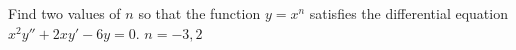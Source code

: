 {Find two values of $n$ so that the function $y=x^n$ satisfies the differential equation $x^2y''+2xy'-6y=0$.}
{$n=-3,2$}